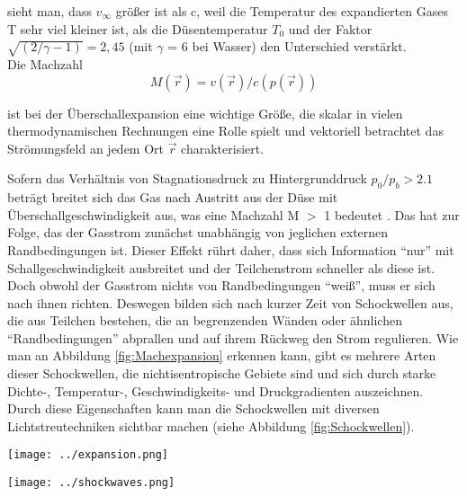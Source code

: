 sieht man, dass $v_{\infty}$ größer ist als c, weil die Temperatur des expandierten Gases T sehr viel kleiner ist, als die Düsentemperatur $T_0$ und der Faktor $\sqrt{(2/\gamma -1)}=2,45$ (mit $\gamma$ = 6 bei Wasser) den Unterschied verstärkt.\\
Die Machzahl 
\begin{equation}
M(\vec{r})= v(\vec{r})/c(p(\vec{r}))
\end{equation}

ist bei der Überschallexpansion eine wichtige Größe, die skalar in vielen thermodynamischen Rechnungen eine Rolle spielt und vektoriell betrachtet das Strömungsfeld an jedem Ort $\vec{r}$ charakterisiert. 

Sofern das Verhältnis von Stagnationsdruck zu Hintergrunddruck $p_0/p_b > 2.1$ beträgt breitet sich das Gas nach Austritt aus der Düse mit Überschallgeschwindigkeit aus, was eine Machzahl M $>$ 1 bedeutet \cite{scoles1988}. Das hat zur Folge, das der Gasstrom zunächst unabhängig von jeglichen externen Randbedingungen ist. Dieser Effekt rührt daher, dass sich Information \enquote{nur} mit Schallgeschwindigkeit ausbreitet und der Teilchenstrom schneller als diese ist. Doch obwohl der Gasstrom nichts von Randbedingungen \enquote{weiß}, muss er sich nach ihnen richten. Deswegen bilden sich nach kurzer Zeit von Schockwellen aus, die aus Teilchen bestehen, die an begrenzenden Wänden oder ähnlichen \enquote{Randbedingungen} abprallen und auf ihrem Rückweg den Strom regulieren. Wie man an Abbildung \ref{fig:Machexpansion} erkennen kann, gibt es mehrere Arten dieser Schockwellen, die nichtisentropische Gebiete sind und sich durch starke Dichte-, Temperatur-, Geschwindigkeits- und Druckgradienten auszeichnen. Durch diese Eigenschaften kann man die Schockwellen mit diversen Lichtstreutechniken sichtbar machen \cite{Mou09} (siehe Abbildung \ref{fig:Schockwellen}).
%
\begin{center}
\begin{minipage}{\linewidth}
\centering
\texttt{[image: ../expansion.png]}%
 \label{fig:Machexpansion}
\end{minipage} 
\end{center} 
%
\begin{center}
\begin{minipage}{\linewidth}
\centering
\texttt{[image: ../shockwaves.png]}%
 \label{fig:Schockwellen}
\end{minipage} 
\end{center} 
